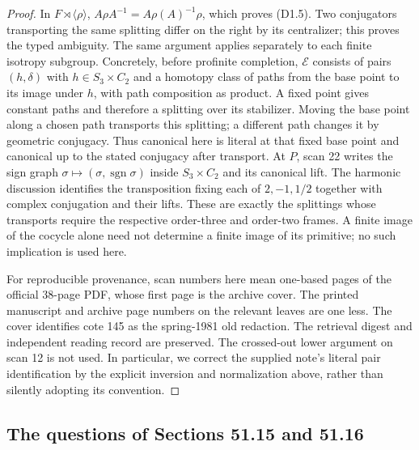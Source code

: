\begin{proof}
In $F\rtimes\langle\rho\rangle$,
$A\rho A^{-1}=A\rho(A)^{-1}\rho$,
which proves (D1.5). Two conjugators
transporting the same splitting differ
on the right by its centralizer; this
proves the typed ambiguity. The same
argument applies separately to each
finite isotropy subgroup. Concretely, before profinite completion,
$\mathcal E$ consists of pairs $(h,\delta)$
with $h\in S_3\times C_2$ and a homotopy
class of paths from the base point to
its image under $h$, with path composition
as product. A fixed point gives constant
paths and therefore a splitting over its
stabilizer. Moving the base point along
a chosen path transports this splitting;
a different path changes it by geometric
conjugacy. Thus canonical here is literal
at that fixed base point and canonical
up to the stated conjugacy after transport.
At $P$, scan 22
writes the sign graph
$\sigma\mapsto(\sigma,\operatorname{sgn}\sigma)$
inside $S_3\times C_2$ and its canonical
lift. The harmonic discussion identifies
the transposition fixing each of
$2,-1,1/2$ together with complex
conjugation and their lifts. These
are exactly the splittings whose
transports require the respective
order-three and order-two frames.
A finite image of the cocycle alone
need not determine a finite image
of its primitive; no such implication
is used here.

For reproducible provenance, scan numbers
here mean one-based pages of the official
38-page PDF, whose first page is the
archive cover. The printed manuscript
and archive page numbers on the relevant
leaves are one less. The cover identifies
cote 145 as the spring-1981 old redaction.
The retrieval digest and independent
reading record are preserved. The
crossed-out lower argument on scan 12
is not used. In particular, we correct
the supplied note's literal pair
identification by the explicit inversion
and normalization above, rather than
silently adopting its convention.
\end{proof}

\subsection{The questions of Sections 51.15 and 51.16}

